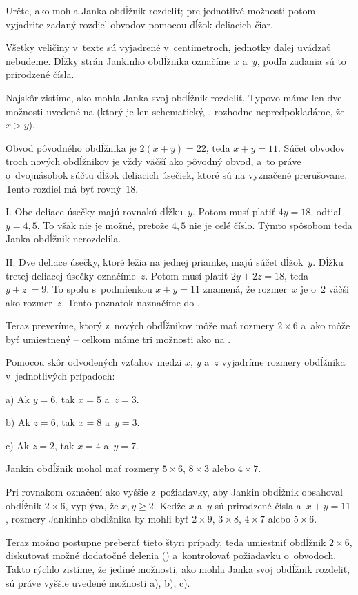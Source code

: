{%
\napad
Určte, ako mohla Janka obdĺžnik rozdeliť; pre jednotlivé možnosti potom
vyjadrite zadaný rozdiel obvodov pomocou dĺžok deliacich čiar.

\riesenie
Všetky veličiny v~texte sú vyjadrené v~centimetroch, jednotky ďalej uvádzať
nebudeme.
Dĺžky strán Jankinho obdĺžnika označíme $x$ a~$y$, podľa zadania sú to
prirodzené čísla.

Najskôr zistíme, ako mohla Janka svoj obdĺžnik rozdeliť.
Typovo máme len dve možnosti uvedené na \obr{} (ktorý je len
schematický, \tj. rozhodne nepredpokladáme, že $x>y$).
%

Obvod pôvodného obdĺžnika je $2(x + y) = 22$, teda $x + y = 11$.
Súčet obvodov troch nových obdĺžnikov je vždy väčší ako pôvodný obvod,
a~to práve o~dvojnásobok súčtu dĺžok deliacich úsečiek, ktoré sú na 
vyznačené prerušovane.
Tento rozdiel má byť rovný~$18$.

\smallskip
I.
Obe deliace úsečky majú rovnakú dĺžku~$y$.
Potom musí platiť $4y = 18$, odtiaľ $y = 4{,}5$.
To však nie je možné, pretože $4{,}5$ nie je celé číslo.
Týmto spôsobom teda Janka obdĺžnik nerozdelila.

\smallskip
II.
Dve deliace úsečky, ktoré ležia na jednej priamke, majú súčet dĺžok~$y$.
Dĺžku tretej deliacej úsečky označíme~$z$.
Potom musí platiť $2y + 2z = 18$, teda
$
y + z~= 9.
$
To spolu s~podmienkou $x + y = 11$ znamená, že rozmer~$x$ je o~$2$ väčší ako
rozmer~$z$.
Tento poznatok naznačíme do \obr.
%

Teraz preveríme, ktorý z~nových obdĺžnikov môže mať rozmery $2\times 6$ a~ako
môže byť umiestnený -- celkom máme tri možnosti ako na \obr.
%

Pomocou skôr odvodených vzťahov medzi $x$, $y$ a~$z$
vyjadríme rozmery obdĺžnika v~jednotlivých prípadoch:

a) Ak $y=6$, tak $x=5$ a~$z=3$. %

b) Ak $z=6$, tak $x=8$ a~$y=3$. %

c) Ak $z=2$, tak $x=4$ a~$y=7$. %

Jankin obdĺžnik mohol mať rozmery $5\times6$, $8\times3$ alebo $4\times7$.

\poznamka
Pri rovnakom označení ako vyššie z~požiadavky, aby Jankin obdĺžnik obsahoval
obdĺžnik $2\times6$, vyplýva, že $x,y\ge2$.
Keďže $x$ a~$y$ sú prirodzené čísla a~$x+y=11$, rozmery Jankinho obdĺžnika
by mohli byť $2\times9$, $3\times8$, $4\times7$ alebo $5\times6$.
%

Teraz možno postupne preberať tieto štyri prípady, teda
umiestniť obdĺžnik $2\times6$,
diskutovať možné dodatočné delenia (\obr)
a~kontrolovať požiadavku o~obvodoch.
Takto rýchlo zistíme, že jediné možnosti, ako mohla Janka svoj obdĺžnik
rozdeliť, sú práve vyššie uvedené možnosti a), b), c).
}

